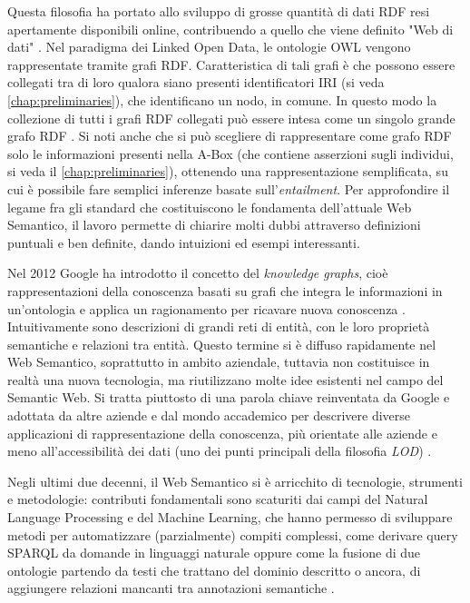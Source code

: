 Questa filosofia ha portato allo sviluppo di grosse quantità di dati RDF resi apertamente disponibili online, contribuendo a quello che viene definito "Web di dati" \cite{polleres2013reasoningLOD}. Nel paradigma dei Linked Open Data, le ontologie OWL vengono rappresentate tramite grafi RDF. Caratteristica di tali grafi è che possono essere collegati tra di loro qualora siano presenti identificatori IRI (si veda \autoref{chap:preliminaries}), che identificano un nodo, in comune. In questo modo la collezione di tutti i grafi RDF collegati può essere intesa come un singolo grande grafo RDF \cite{polleres2013reasoningLOD}. Si noti anche che si può scegliere di rappresentare come grafo RDF solo le informazioni presenti nella A-Box (che contiene asserzioni sugli individui, si veda il \autoref{chap:preliminaries}), ottenendo una rappresentazione semplificata, su cui è possibile fare semplici inferenze basate sull'\emph{entailment}. Per approfondire il legame fra gli standard che costituiscono le fondamenta dell'attuale Web Semantico, il lavoro \cite{polleres2013reasoningLOD} permette di chiarire molti dubbi attraverso definizioni puntuali e ben definite, dando intuizioni ed esempi interessanti.

Nel 2012 Google ha introdotto il concetto del \emph{knowledge graphs}, cioè rappresentazioni della conoscenza basati su grafi che integra le informazioni in un'ontologia e applica un ragionamento per ricavare nuova conoscenza \cite{ehrlinger2016towards}. Intuitivamente sono descrizioni di grandi reti di entità, con le loro proprietà semantiche e relazioni tra entità. Questo termine si è diffuso rapidamente nel Web Semantico, soprattutto in ambito aziendale, tuttavia non costituisce in realtà una nuova tecnologia, ma riutilizzano molte idee esistenti nel campo del Semantic Web. Si tratta piuttosto di una parola chiave reinventata da Google e adottata da altre aziende e dal mondo accademico per descrivere diverse applicazioni di rappresentazione della conoscenza, più orientate alle aziende e meno all'accessibilità dei dati (uno dei punti principali della filosofia \textit{LOD}) \cite{ehrlinger2016towards, hitzler2021review}.

Negli ultimi due decenni, il Web Semantico si è arricchito di tecnologie, strumenti e metodologie: contributi fondamentali sono scaturiti dai campi del Natural Language Processing e del Machine Learning, che hanno permesso di sviluppare metodi per automatizzare (parzialmente) compiti complessi, come derivare query SPARQL da domande in linguaggi naturale \cite{Evseev2020SPARQLQG, Zlatareva2021ProcessingNL, Hu2021NaturalLQ} oppure come la fusione di due ontologie partendo da testi che trattano del dominio descritto \cite{caldarolaMultiStrategyApproach} o ancora, di aggiungere relazioni mancanti tra annotazioni semantiche \cite{discoveringmissingsemanticrelation, repairinghiddenlinks}. 

